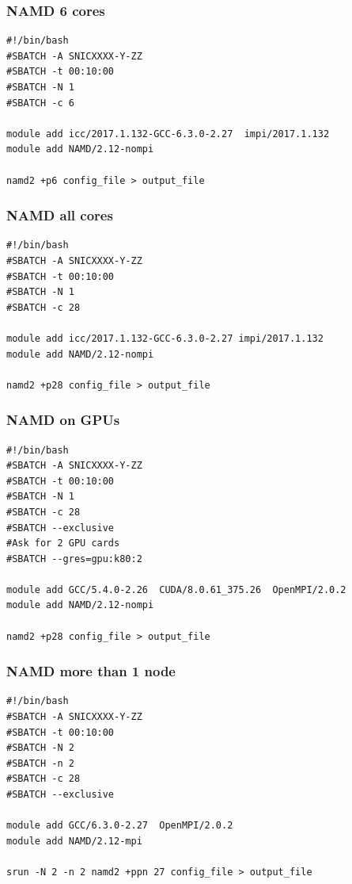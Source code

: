\begin{frame}[fragile]
	\frametitle{NAMD 6 cores}
  
        \begin{verbatim}             
#!/bin/bash
#SBATCH -A SNICXXXX-Y-ZZ
#SBATCH -t 00:10:00
#SBATCH -N 1
#SBATCH -c 6

module add icc/2017.1.132-GCC-6.3.0-2.27  impi/2017.1.132
module add NAMD/2.12-nompi

namd2 +p6 config_file > output_file
        \end{verbatim}

\end{frame}

\begin{frame}[fragile]
	\frametitle{NAMD all cores}
  
        \begin{verbatim}             
#!/bin/bash
#SBATCH -A SNICXXXX-Y-ZZ
#SBATCH -t 00:10:00
#SBATCH -N 1
#SBATCH -c 28

module add icc/2017.1.132-GCC-6.3.0-2.27 impi/2017.1.132
module add NAMD/2.12-nompi

namd2 +p28 config_file > output_file
        \end{verbatim}

\end{frame}


\begin{frame}[fragile]
	\frametitle{NAMD on GPUs}
  
        \begin{verbatim}             
#!/bin/bash
#SBATCH -A SNICXXXX-Y-ZZ
#SBATCH -t 00:10:00
#SBATCH -N 1
#SBATCH -c 28
#SBATCH --exclusive
#Ask for 2 GPU cards
#SBATCH --gres=gpu:k80:2

module add GCC/5.4.0-2.26  CUDA/8.0.61_375.26  OpenMPI/2.0.2
module add NAMD/2.12-nompi

namd2 +p28 config_file > output_file
        \end{verbatim}

\end{frame}



\begin{frame}[fragile]
	\frametitle{NAMD more than 1 node}
  
        \begin{verbatim}             
#!/bin/bash
#SBATCH -A SNICXXXX-Y-ZZ
#SBATCH -t 00:10:00
#SBATCH -N 2
#SBATCH -n 2
#SBATCH -c 28
#SBATCH --exclusive

module add GCC/6.3.0-2.27  OpenMPI/2.0.2
module add NAMD/2.12-mpi

srun -N 2 -n 2 namd2 +ppn 27 config_file > output_file
        \end{verbatim}

\end{frame}

